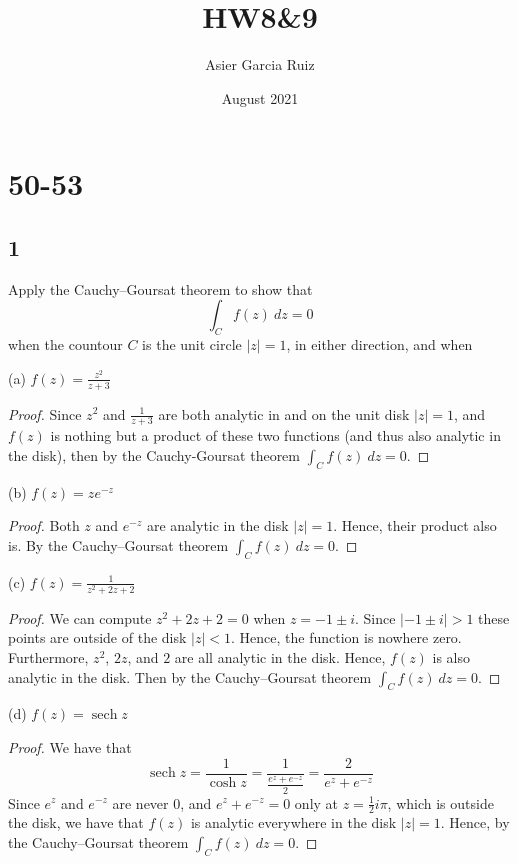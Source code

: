 \documentclass{article}
\title{HW8\&9}
\author{Asier Garcia Ruiz }
\date{August 2021}
\DeclareMathOperator*{\sech}{sech}
\begin{document}
\maketitle

\section*{50-53}
\subsection*{1}
Apply the Cauchy–Goursat theorem to show that
\begin{equation*}
    \int_C f(z) \ dz = 0
\end{equation*}
when the countour $C$ is the unit circle $|z| = 1$,
in either direction, and when


(a) $f(z) = \frac{z^2}{z+3}$
\begin{proof}
    Since $z^2$ and $\frac{1}{z + 3}$ are both analytic in and on the unit disk $|z|= 1$,
    and $f(z)$ is nothing but a product of these two functions (and thus also analytic
    in the disk),
    then by the Cauchy-Goursat theorem $\int_C f(z) \ dz = 0$.
\end{proof}

(b) $f(z) = ze^{-z}$
\begin{proof}
    Both $z$ and $e^{-z}$ are analytic in the disk $|z|=1$. Hence, their product
    also is. By the Cauchy–Goursat theorem $\int_C f(z) \ dz = 0$.
\end{proof}

(c) $f(z) = \frac{1}{z^2 + 2z + 2}$
\begin{proof}
    We can compute $z^2 + 2z + 2 = 0$ when $z = -1 \pm i$. Since $|-1 \pm i| > 1$
    these points are outside of the disk $|z| < 1$. Hence, the function is
    nowhere zero. Furthermore, $z^2$, $2z$, and $2$ are all analytic in the disk.
    Hence, $f(z)$ is also analytic in the disk. Then by the Cauchy–Goursat
    theorem $\int_C f(z) \ dz = 0$.
\end{proof}

(d) $f(z) = \sech z$
\begin{proof}
    We have that
    \begin{equation*}
        \sech z = \frac{1}{\cosh z} = \frac{1}{\frac{e^z + e^{-z}}{2}} =
        \frac{2}{e^z + e^{-z}}
    \end{equation*}
    Since $e^z$ and $e^{-z}$ are never $0$, and $e^z + e^{-z} = 0$ only at
    $z = \frac{1}{2}i\pi$, which is outside the disk, we have that $f(z)$ is analytic
    everywhere in the disk $|z| = 1$. Hence, by the Cauchy–Goursat theorem
    $\int_C f(z) \ dz = 0$.
\end{proof}
\end{document}
